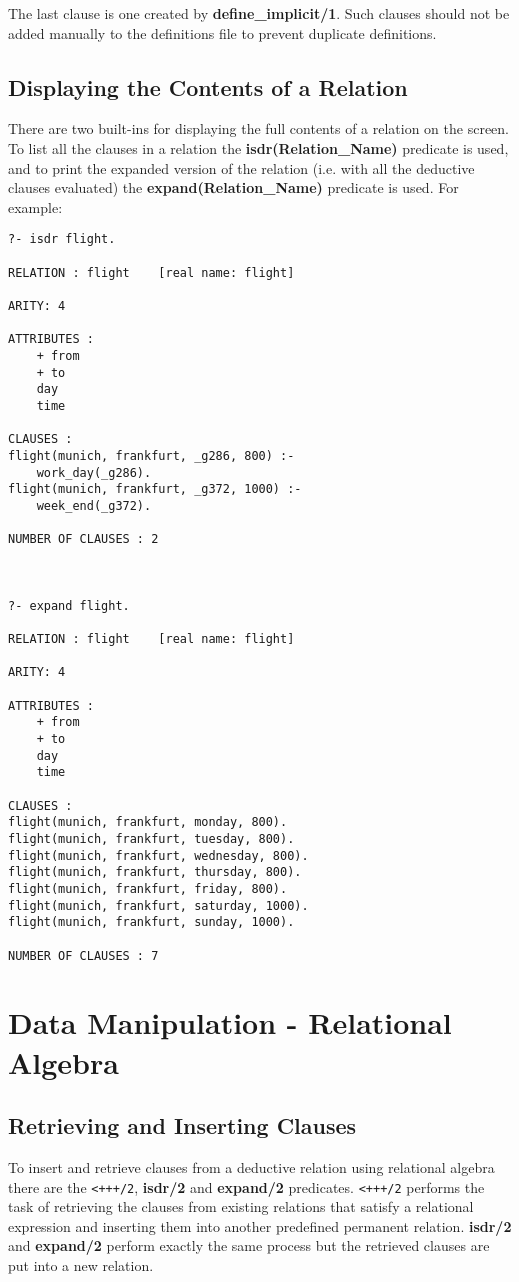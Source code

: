 The last clause is one created by {\bf define\_implicit/1}. Such clauses
should not be added manually to the definitions file to prevent 
duplicate definitions.


\subsection{Displaying the Contents of a Relation}

There are two built-ins for displaying the full 
contents of a relation on the screen.  To list  all the 
clauses in a relation the {\bf isdr(Relation\_Name)} predicate is used,
 
and to print the expanded version of the relation (i.e. with all the 
deductive clauses evaluated) the {\bf expand(Relation\_Name)}
predicate is used. For example:

\begin{verbatim}
?- isdr flight.

RELATION : flight    [real name: flight]

ARITY: 4

ATTRIBUTES :
    + from
    + to
    day
    time

CLAUSES :
flight(munich, frankfurt, _g286, 800) :-
    work_day(_g286).
flight(munich, frankfurt, _g372, 1000) :-
    week_end(_g372).

NUMBER OF CLAUSES : 2



?- expand flight.

RELATION : flight    [real name: flight]

ARITY: 4

ATTRIBUTES :
    + from
    + to
    day
    time

CLAUSES :
flight(munich, frankfurt, monday, 800).
flight(munich, frankfurt, tuesday, 800).
flight(munich, frankfurt, wednesday, 800).
flight(munich, frankfurt, thursday, 800).
flight(munich, frankfurt, friday, 800).
flight(munich, frankfurt, saturday, 1000).
flight(munich, frankfurt, sunday, 1000).

NUMBER OF CLAUSES : 7
\end{verbatim}

\section{Data Manipulation - Relational Algebra}

\subsection{Retrieving and Inserting Clauses}
To insert and retrieve clauses from a deductive relation
using relational algebra there are the \verb-<+++/2-, {\bf isdr/2}
and {\bf expand/2} predicates.  \verb-<+++/2- performs the task of
  
retrieving the clauses from existing relations that satisfy a relational
expression and inserting them into another predefined permanent
relation.  {\bf isdr/2} and {\bf expand/2} perform exactly the same
process but the retrieved clauses are put into a new 
relation.



